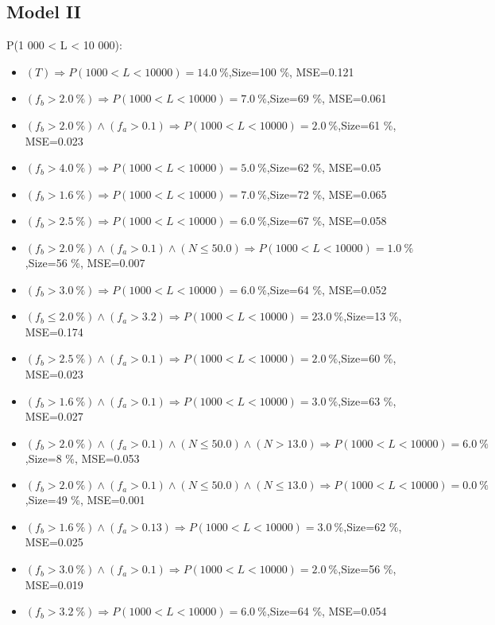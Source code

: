 \documentclass[numbered]{CSL}
\begin{document}
\subsection{Model II}
P(1 000 < L < 10 000):
\begin{itemize}
\item $(T) \Rightarrow P(1 000 < L < 10 000) = 14.0~\%$,\hfill Size=100 \%, MSE=0.121
\item $(f_b > 2.0~\%) \Rightarrow P(1 000 < L < 10 000) = 7.0~\%$,\hfill Size=69 \%, MSE=0.061
\item $(f_b > 2.0~\%) \land (f_a > 0.1) \Rightarrow P(1 000 < L < 10 000) = 2.0~\%$,\hfill Size=61 \%, MSE=0.023
\item $(f_b > 4.0~\%) \Rightarrow P(1 000 < L < 10 000) = 5.0~\%$,\hfill Size=62 \%, MSE=0.05
\item $(f_b > 1.6~\%) \Rightarrow P(1 000 < L < 10 000) = 7.0~\%$,\hfill Size=72 \%, MSE=0.065
\item $(f_b > 2.5~\%) \Rightarrow P(1 000 < L < 10 000) = 6.0~\%$,\hfill Size=67 \%, MSE=0.058
\item $(f_b > 2.0~\%) \land (f_a > 0.1) \land (N \leq 50.0) \Rightarrow P(1 000 < L < 10 000) = 1.0~\%$,\hfill Size=56 \%, MSE=0.007
\item $(f_b > 3.0~\%) \Rightarrow P(1 000 < L < 10 000) = 6.0~\%$,\hfill Size=64 \%, MSE=0.052
\item $(f_b \leq 2.0~\%) \land (f_a > 3.2) \Rightarrow P(1 000 < L < 10 000) = 23.0~\%$,\hfill Size=13 \%, MSE=0.174
\item $(f_b > 2.5~\%) \land (f_a > 0.1) \Rightarrow P(1 000 < L < 10 000) = 2.0~\%$,\hfill Size=60 \%, MSE=0.023
\item $(f_b > 1.6~\%) \land (f_a > 0.1) \Rightarrow P(1 000 < L < 10 000) = 3.0~\%$,\hfill Size=63 \%, MSE=0.027
\item $(f_b > 2.0~\%) \land (f_a > 0.1) \land (N \leq 50.0) \land (N > 13.0) \Rightarrow P(1 000 < L < 10 000) = 6.0~\%$,\hfill Size=8 \%, MSE=0.053
\item $(f_b > 2.0~\%) \land (f_a > 0.1) \land (N \leq 50.0) \land (N \leq 13.0) \Rightarrow P(1 000 < L < 10 000) = 0.0~\%$,\hfill Size=49 \%, MSE=0.001
\item $(f_b > 1.6~\%) \land (f_a > 0.13) \Rightarrow P(1 000 < L < 10 000) = 3.0~\%$,\hfill Size=62 \%, MSE=0.025
\item $(f_b > 3.0~\%) \land (f_a > 0.1) \Rightarrow P(1 000 < L < 10 000) = 2.0~\%$,\hfill Size=56 \%, MSE=0.019
\item $(f_b > 3.2~\%) \Rightarrow P(1 000 < L < 10 000) = 6.0~\%$,\hfill Size=64 \%, MSE=0.054

\end{itemize}
\end{document}
